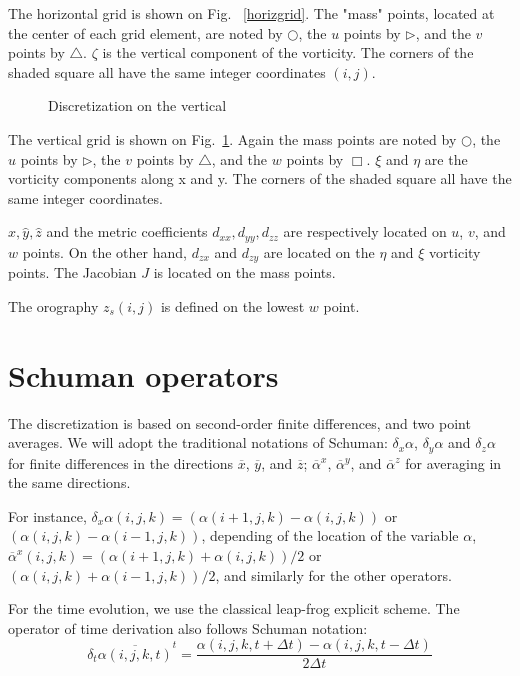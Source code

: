 The horizontal grid is shown on Fig. ~\ref{horizgrid}.
The "mass" points, located at the center of each grid element, are noted
by $\bigcirc$, the $u$ points by $\triangleright$, and the $v$ points
by  $\bigtriangleup$.
$\zeta $ is the vertical component of the vorticity.
The corners of the shaded square all have the same integer coordinates
$(i,j)$.

\begin{figure}[pbh]
\vspace{1cm}
\caption{Discretization on the vertical \label{vertgrid}}
\end{figure}

The vertical grid is shown on Fig.~\ref{vertgrid}.
Again the mass points are noted by
$\bigcirc$, the $u$ points by $\triangleright$, the $v$ points
by $\bigtriangleup$,
and the $w$ points by $\Box$. $\xi$ and $\eta$ are the vorticity components
along x and y. The corners of the shaded square all
have the same integer coordinates.

$\widehat{x},\widehat{y},\widehat{z}$
and the metric coefficients $d_{xx},d_{yy},d_{zz}$ are
respectively located on $u$, $v$, and $w$ points. On the other hand,
$d_{zx}$ and $d_{zy}$ are located on the $\eta$ and $\xi$ vorticity points.
The Jacobian $J$ is located on the mass points.

The orography $z_{s}(i,j)$ is defined on the lowest $w$ point.

\section{Schuman operators}
The discretization is based on second-order finite differences, and two point
averages. We will adopt the traditional notations of Schuman:
$\delta_{x}\alpha$, $\delta_{y}\alpha$ and $\delta_{z}\alpha$ for finite
differences in the directions $\overline{x}$,  $\overline{y}$, and
$\overline{z}$;  $\overline{\alpha}^{x}$, $\overline{\alpha}^{y}$, and
$\overline{\alpha}^{z}$ for averaging in the same directions.

For instance, $\delta_x\alpha (i,j,k)= (\alpha(i+1,j,k)-\alpha(i,j,k))$
or $(\alpha(i,j,k) -\alpha(i-1,j,k))$, depending of the location of
the variable $\alpha$, $\overline{\alpha}^{x}(i,j,k)=(\alpha(i+1,j,k)+
\alpha(i,j,k))/2$ or $(\alpha(i,j,k)+\alpha(i-1,j,k))/2$, and
similarly for the other operators.

For the time evolution,
we use the classical leap-frog explicit scheme. The operator of time
derivation also follows Schuman notation:
\begin{equation}
\delta _{t}\overline{ \alpha (i,j,k,t)}^{t} =
\dfrac{\alpha (i,j,k,t+\Delta t)-\alpha (i,j,k,t-\Delta t)}{2 \Delta t}
\end{equation}


